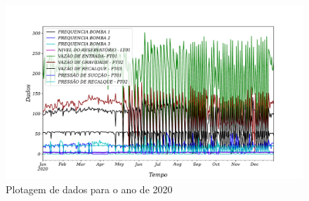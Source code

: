 \begin{figure}[H]
	\centering
	\caption{Plotagem de dados para o ano de 2020}\label{fig:2020-a-frente}
	\includegraphics[width=0.9\linewidth]{"Introducao/Figuras/2020 a frente"}

	
\end{figure}





